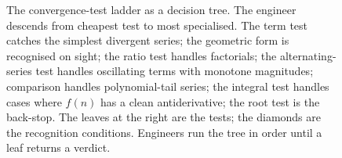 \begin{figure}[p]
\caption[Convergence-test decision tree]{The convergence-test ladder
as a decision tree. The engineer descends from cheapest test to most
specialised. The term test catches the simplest divergent series; the
geometric form is recognised on sight; the ratio test handles factorials;
the alternating-series test handles oscillating terms with monotone
magnitudes; comparison handles polynomial-tail series; the integral test
handles cases where $f(n)$ has a clean antiderivative; the root test is
the back-stop. The leaves at the right are the tests; the diamonds are
the recognition conditions. Engineers run the tree in order until a leaf
returns a verdict.}
\label{fig:vol02:ch04:test-decision-tree}
\end{figure}
